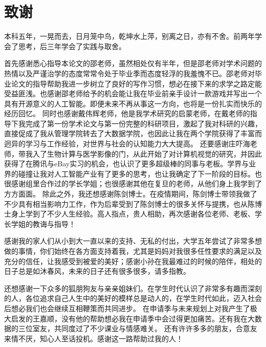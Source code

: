 \chapter*{致谢}
本科五年，一晃而去，日月笼中鸟，乾坤水上萍，别离之日，亦有不舍。前两年学会了思考，后三年学会了实践与取舍。

首先感谢悉心指导本论文的邵老师，虽然相处仅有半年，但是邵老师对学术问题的热情以及严谨治学的态度常常令处于毕业季而态度轻浮的我羞愧不已。邵老师对毕业论文的指导帮助我进一步树立了良好的写作习惯，想必在接下来的求学之路定能受益匪浅。也感谢邵老师给予的机会能让我在毕业前亲手设计一款游戏并写出一个具有开源意义的人工智能。即便未来不再从事这一方向，也将是一份扎实而快乐的经历回忆。
同时也感谢戴伟辉老师，他是我学术研究的启蒙老师，在戴老师的指导下我完成了第一份学术论文与第一份完整的科研项目，激起了我对科研的兴趣，直接促成了我从管理学院转去了大数据学院，也因此让我在两个学院获得了丰富而迥异的学习与工作经验，对世界与社会的认知能力大大提高。
还要感谢庄吓海老师，带我入了生物计算与医学影像的门，从此开始了对计算机视觉的研究，并因此获得了在腾讯与eBay实习的机会，也认识了更多超级棒的同事与老板。学界与业界的碰撞让我对人工智能产业有了更多的思考，也让我确定了下一阶段的目标。也很感谢组里合作过的学长学姐；也很感谢其他在复旦的老师，从他们身上我学到了方方面面。
除此之外，我还想感谢陈剑博士。在疫情期间，陈剑博士带领我做了不少具有相当影响力工作，作为后辈受到了陈剑博士的很多关怀与提携，也从陈博士身上学到了不少人生经验。高人指点，贵人相助，再次感谢各位老师、老板、学长学姐的教诲与指导！

感谢我的家人们从小到大一直以来的支持、无私的付出，大学五年尝试了非常多想做的事情，你们始终在各方面支持着我，尤其是妈妈对我很多任性要求的满足以及充分的信任，让我感受到被爱的美好；感谢小孙在我最难过的时候的陪伴，相处的日子总是如沐春风，未来的日子还有很多很多，请多指教。

还想感谢一下众多的狐朋狗友与亲亲姐妹们。在学生时代认识了非常多有趣而深刻的人，各位追求自己人生中的美好的模样总是动人的，在学生时代如此，迈入社会后想必我们也会继续互相鞭策而共同进步。
在申请季与未来规划上对我产生了极大启发的王嘉顺，没有他的帮助想必我在申请季中会过得更加痛苦。还有我在大数据的三位室友，共同度过了不少课业与情感难关。
还有许许多多的朋友，合意友来情不厌，知心人至话投机。感谢这一路帮助过我的人！

